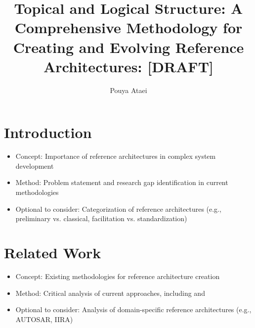 \documentclass[12pt,a4paper]{article}
\title{Topical and Logical Structure: A Comprehensive Methodology for Creating and Evolving Reference Architectures: [DRAFT]}
\author{Pouya Ataei}
\date{}
\begin{document}
\maketitle

\section{Introduction}
\begin{itemize}
    \item Concept: Importance of reference architectures in complex system development \citep{Angelov2012}
    \item Method: Problem statement and research gap identification in current methodologies \citep{Nakagawa2014}
    \item Optional to consider: Categorization of reference architectures (e.g., preliminary vs. classical, facilitation vs. standardization) \citep{Nakagawa2023}
\end{itemize}

\section{Related Work}
\begin{itemize}
    \item Concept: Existing methodologies for reference architecture creation
    \item Method: Critical analysis of current approaches, including \citet{Galster2011} and \citet{Nakagawa2014}
    \item Optional to consider: Analysis of domain-specific reference architectures (e.g., AUTOSAR, IIRA) \citep{Nakagawa2023}
\end{itemize}
\end{document}
